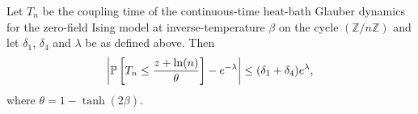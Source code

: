 

	\begin{corollary}
	\label{cor:bound distance prob[w=0] and e^-lambda}
	Let $T_n$ be the coupling time of the continuous-time heat-bath Glauber dynamics for the zero-field Ising model at inverse-temperature $\beta$ on the cycle $(\mathbb{Z}/n\mathbb{Z})$ and let $\delta_1$, $\delta_4$ and $\lambda$ be as defined above. Then
		\begin{equation}
			\left|\mathbb{P}\left[T_n \leq \frac{z+\ln(n)}{\theta}\right] - e^{-\lambda}\right| \leq (\delta_1 + \delta_4)e^\lambda,
			\label{eq:bound distance prob[w=0] and e^-lambda}
		\end{equation}
		where $\theta = 1 - \tanh(2\beta)$.
	\end{corollary}	


